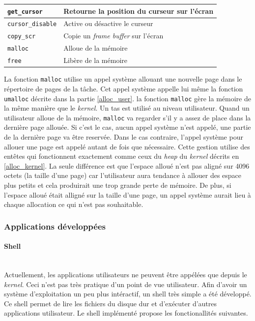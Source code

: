 \begin{center}
{\begin{tabular}{| l | l |}
            \texttt{get_cursor} & Retourne la position du curseur sur
            l'écran \\ \hline
            \texttt{cursor_disable} & Active ou désactive le curseur \\ \hline
            \texttt{copy_scr} & Copie un \textit{frame buffer} sur
            l'écran \\ \hline
            \texttt{malloc} & Alloue de la mémoire \\ \hline
            \texttt{free} & Libère de la mémoire \\ \hline
		\end{tabular}
	}
\end{center}

La fonction \texttt{malloc} utilise un appel système allouant une nouvelle
page dans le répertoire de pages de la tâche. Cet appel système appelle lui même
la fonction \texttt{umalloc} décrite dans la partie \ref{alloc_user}.
la fonction \texttt{malloc} gère la mémoire de la même manière que le
\textit{kernel}. Un tas est utilisé au niveau utilisateur. Quand un utilisateur
alloue de la mémoire, \texttt{malloc} va regarder s'il y a assez de
place dans la dernière page allouée. Si c'est le cas, aucun appel système n'est
appelé, une partie de la dernière page va être reservée. Dans le cas contraire,
l'appel système pour allouer une page est appelé autant de fois que nécessaire.
Cette gestion utilise des entêtes qui fonctionnent exactement comme ceux du
\textit{heap} du \textit{kernel} décrits en \ref{alloc_kernel}. La seule différence
est que l'espace alloué n'est pas aligné sur 4096 octets (la taille d'une page)
car l'utilisateur aura tendance à allouer des espace plus petits et cela produirait
une trop grande perte de mémoire. De plus, si l'espace alloué était alligné sur
la taille d'une page, un appel système aurait lieu à chaque allocation ce qui n'est
pas souhaitable.

\subsubsection{Applications développées}
\paragraph{Shell} \mbox{} \\
Actuellement, les applications utilisateurs ne peuvent être appélées que depuis
le \textit{kernel}. Ceci n'est pas très pratique d'un point de vue utilisateur.
Afin d'avoir un système d'exploitation un peu plus intéractif, un shell très
simple a été développé. Ce shell permet de lire les fichiers du disque dur et
d'exécuter d'autres applications utilisateur. Le shell implémenté propose
les fonctionallités suivantes.

